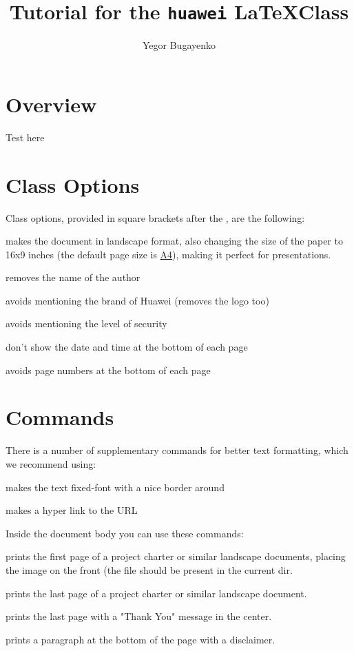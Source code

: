 \documentclass[nosecurity]{./huawei}
\title{Tutorial for the \texttt{huawei} \LaTeX Class}
\author{Yegor Bugayenko}
\begin{document}
\section{Overview}

Test here

\section{Class Options}

Class options, provided in square brackets after the
, are the following:

  makes the document in landscape format, also changing the size
  of the paper to 16x9 inches (the default page size is
  \href{https://en.wikipedia.org/wiki/Paper_size}{A4}),
  making it perfect for presentations.

  removes the name of the author

  avoids mentioning the brand of Huawei (removes the logo too)

  avoids mentioning the level of security

  don't show the date and time at the bottom of each page

  avoids page numbers at the bottom of each page

\section{Commands}

There is a number of supplementary commands for better text formatting,
which we recommend using:

  makes the text fixed-font with a nice border around

  makes a hyper link to the URL

Inside the document body you can use these commands:

  prints the first page of a project charter or similar landscape documents,
  placing the image  on the front (the file should be present
  in the current dir.

  prints the last page of a project charter or similar landscape document.

  prints the last page with a "Thank You" message in the center.

  prints a paragraph at the bottom of the page with a disclaimer.
\end{document}
